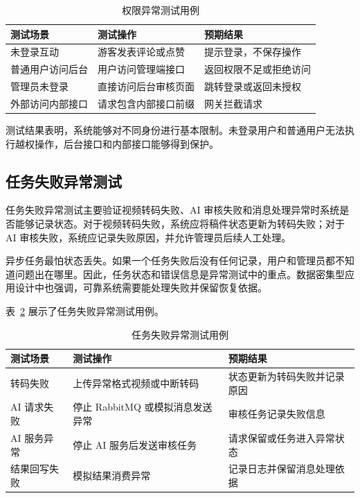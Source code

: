 \begin{table}[htbp]
  \centering
  \caption{权限异常测试用例}
  \label{tab:permission-exception-test}
  \begin{tabular}{p{}p{}p{}}
    \hline
    \textbf{测试场景} & \textbf{测试操作} & \textbf{预期结果} \\
    \hline
    未登录互动 & 游客发表评论或点赞 & 提示登录，不保存操作 \\
    普通用户访问后台 & 用户访问管理端接口 & 返回权限不足或拒绝访问 \\
    管理员未登录 & 直接访问后台审核页面 & 跳转登录或返回未授权 \\
    外部访问内部接口 & 请求包含内部接口前缀 & 网关拦截请求 \\
    \hline
  \end{tabular}
\end{table}

测试结果表明，系统能够对不同身份进行基本限制。未登录用户和普通用户无法执行越权操作，后台接口和内部接口能够得到保护。

\subsection{任务失败异常测试}
\label{subsec:task-failure-test}

任务失败异常测试主要验证视频转码失败、AI 审核失败和消息处理异常时系统是否能够记录状态。对于视频转码失败，系统应将稿件状态更新为转码失败；对于 AI 审核失败，系统应记录失败原因，并允许管理员后续人工处理。

异步任务最怕状态丢失。如果一个任务失败后没有任何记录，用户和管理员都不知道问题出在哪里。因此，任务状态和错误信息是异常测试中的重点。数据密集型应用设计中也强调，可靠系统需要能处理失败并保留恢复依据\cite{kleppmann2017ddia}。

表~\ref{tab:task-failure-test} 展示了任务失败异常测试用例。

\begin{table}[htbp]
  \centering
  \caption{任务失败异常测试用例}
  \label{tab:task-failure-test}
  \begin{tabular}{p{}p{}p{}}
    \hline
    \textbf{测试场景} & \textbf{测试操作} & \textbf{预期结果} \\
    \hline
    转码失败 & 上传异常格式视频或中断转码 & 状态更新为转码失败并记录原因 \\
    AI 请求失败 & 停止 RabbitMQ 或模拟消息发送异常 & 审核任务记录失败信息 \\
    AI 服务异常 & 停止 AI 服务后发送审核任务 & 请求保留或任务进入异常状态 \\
    结果回写失败 & 模拟结果消费异常 & 记录日志并保留消息处理依据 \\
    \hline
  \end{tabular}
\end{table}

